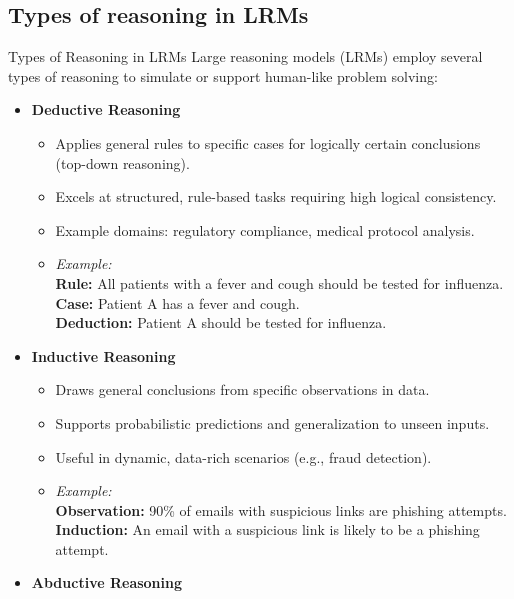 \subsection{Types of reasoning in LRMs}
\begin{frame}[allowframebreaks]{Types of Reasoning in LRMs}
    Large reasoning models (LRMs) employ several types of reasoning to simulate or support human-like problem solving:
    \vspace{0.5em}
    \begin{itemize}
        \item \textbf{Deductive Reasoning}
        \begin{itemize}
            \item Applies general rules to specific cases for logically certain conclusions (top-down reasoning).
            \item Excels at structured, rule-based tasks requiring high logical consistency.
            \item Example domains: regulatory compliance, medical protocol analysis.
            \item \textit{Example:} \\
            \textbf{Rule:} All patients with a fever and cough should be tested for influenza. \\
            \textbf{Case:} Patient A has a fever and cough. \\
            \textbf{Deduction:} Patient A should be tested for influenza.
        \end{itemize}
    \framebreak
        \item \textbf{Inductive Reasoning}
        \begin{itemize}
            \item Draws general conclusions from specific observations in data.
            \item Supports probabilistic predictions and generalization to unseen inputs.
            \item Useful in dynamic, data-rich scenarios (e.g., fraud detection).
            \item \textit{Example:} \\
            \textbf{Observation:} 90\% of emails with suspicious links are phishing attempts. \\
            \textbf{Induction:} An email with a suspicious link is likely to be a phishing attempt.
        \end{itemize}
    \framebreak
        \item \textbf{Abductive Reasoning}

\end{itemize}
\end{frame}

